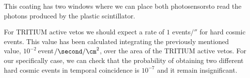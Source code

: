 This coating has two windows where we can place both photosensorsto read the photons produced by the plastic scintillator.

For TRITIUM active vetos we should expect a rate of $1$ events$/\second$ for hard cosmic events. This value has been calculated integrating the previously mentioned value, $10^{-2}~$event$/\second/\cm^2$, over the area of the TRITIUM active vetos. For our specifically case, we can check that the probability of obtaining two different hard cosmic events in temporal coincidence is $10^{-7}$ and it remain insignificant.